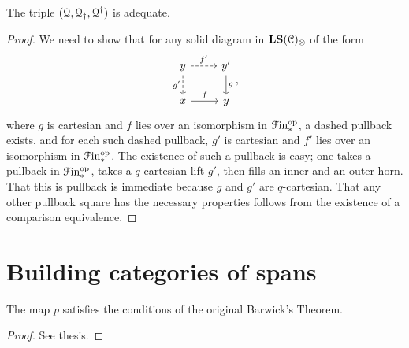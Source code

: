 \documentclass[main.tex]{subfiles}
\begin{document}
\begin{proposition}
  The triple $(\mathcal{Q}, \mathcal{Q}_{\dagger}, \mathcal{Q}^{\dagger})$ is adequate.
\end{proposition}
\begin{proof}
  We need to show that for any solid diagram in $\mathbf{LS}(\mathcal{C})_{\otimes}$ of the form
  \begin{equation*}
    \begin{tikzcd}
      y
      \arrow[r, dashed, "f'"]
      \arrow[d, swap, dashed, "g'"]
      & y'
      \arrow[d, "g"]
      \\
      x
      \arrow[r, "f"]
      & y
    \end{tikzcd},
  \end{equation*}
  where $g$ is cartesian and $f$ lies over an isomorphism in $\mathcal{F}\mathrm{in}_{*}^{\mathrm{op}}$, a dashed pullback exists, and for each such dashed pullback, $g'$ is cartesian and $f'$ lies over an isomorphism in $\mathcal{F}\mathrm{in}_{*}^{\mathrm{op}}$. The existence of such a pullback is easy; one takes a pullback in $\mathcal{F}\mathrm{in}_{*}^{\mathrm{op}}$, takes a $q$-cartesian lift $g'$, then fills an inner and an outer horn. That this is pullback is immediate because $g$ and $g'$ are $q$-cartesian. That any other pullback square has the necessary properties follows from the existence of a comparison equivalence.
\end{proof}

\section{Building categories of spans}
\label{sec:building_categories_of_spans}

\begin{proposition}
  The map $p$ satisfies the conditions of the original Barwick's Theorem.
\end{proposition}
\begin{proof}
  See thesis.
\end{proof}
\end{document}
